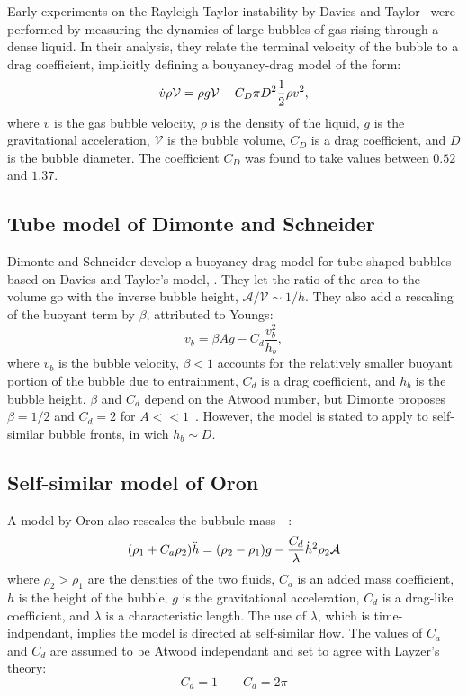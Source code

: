 Early experiments on the Rayleigh-Taylor instability by Davies and Taylor~\cite{Davies1950a} were performed by measuring the dynamics of large bubbles of gas rising through a dense liquid.
In their analysis, they relate the terminal velocity of the bubble to a drag coefficient, implicitly defining a bouyancy-drag model of the form:
\begin{equation} \elabel{dtbd}
\dot{v} \rho \mathcal{V} = \rho g \mathcal{V} - C_D \pi D^2 \frac{1}{2} \rho v^2,
\end{equation}
where $v$ is the gas bubble velocity,
$\rho$ is the density of the liquid,
$g$ is the gravitational acceleration,
$\mathcal{V}$ is the bubble volume,
$C_D$ is a drag coefficient, and
$D$ is the bubble diameter.
The coefficient $C_D$ was found to take values between $0.52$ and $1.37$.

\subsection{Tube model of Dimonte and Schneider}

Dimonte and Schneider develop a buoyancy-drag model for tube-shaped bubbles~\cite{Dimonte1996,Dimonte2000a} based on Davies and Taylor's model, .
They let the ratio of the area to the volume go with the inverse bubble height, $\mathcal{A} / \mathcal{V} \sim 1/h$.
They also add a rescaling of the buoyant term by $\beta$, attributed to Youngs:
\begin{equation}
\dot{v_b}  = \beta A g - C_d \frac{v_b^2}{h_b}, 
\end{equation}
where $v_b$ is the bubble velocity,
$\beta < 1$ accounts for the relatively smaller buoyant portion of the bubble due to entrainment,
$C_d$ is a drag coefficient, and
$h_b$ is the bubble height.
$\beta$ and $C_d$ depend on the Atwood number, but Dimonte proposes $\beta = 1/2$ and $C_d = 2$ for $A << 1$~\cite{Dimonte2000}.
However, the model is stated to apply to self-similar bubble fronts, in wich $h_b \sim D$.

\subsection{Self-similar model of Oron}

A model by Oron \etal also rescales the bubbule mass~~\cite{Oron2001}:
\begin{equation} \elabel{buoyancy_drag}
(\rho_1 + C_a \rho_2) \ddot{h} = (\rho_2 - \rho_1)g - \frac{C_d}{\lambda} \dot{h}^2 \rho_2 \mathcal{A}
\end{equation}
where $\rho_2 > \rho_1$ are the densities of the two fluids, 
$C_a$ is an added mass coefficient,
$h$ is the height of the bubble,
$g$ is the gravitational acceleration,
$C_d$ is a drag-like coefficient, and
$\lambda$ is a characteristic length.
The use of $\lambda$, which is time-indpendant, implies the model is directed at self-similar flow.
The values of $C_a$ and $C_d$ are assumed to be Atwood independant and set to agree with Layzer's theory:
\begin{equation}
C_a = 1 \qquad C_d = 2\pi
\end{equation}

